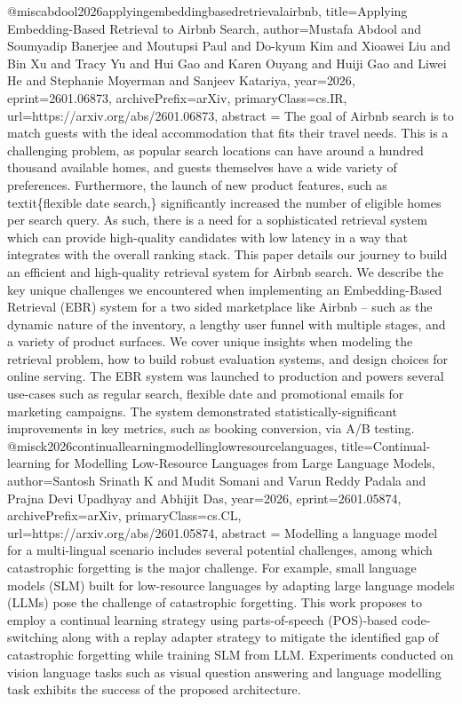 {}@misc{abdool2026applyingembeddingbasedretrievalairbnb,
      title={Applying Embedding-Based Retrieval to Airbnb Search}, 
      author={Mustafa Abdool and Soumyadip Banerjee and Moutupsi Paul and Do-kyum Kim and Xioawei Liu and Bin Xu and Tracy Yu and Hui Gao and Karen Ouyang and Huiji Gao and Liwei He and Stephanie Moyerman and Sanjeev Katariya},
      year={2026},
      eprint={2601.06873},
      archivePrefix={arXiv},
      primaryClass={cs.IR},
      url={https://arxiv.org/abs/2601.06873},
      abstract = {The goal of Airbnb search is to match guests with the ideal accommodation that fits their travel needs. This is a challenging problem, as popular search locations can have around a hundred thousand available homes, and guests themselves have a wide variety of preferences. Furthermore, the launch of new product features, such as \\textit\{flexible date search,\} significantly increased the number of eligible homes per search query. As such, there is a need for a sophisticated retrieval system which can provide high-quality candidates with low latency in a way that integrates with the overall ranking stack.   This paper details our journey to build an efficient and high-quality retrieval system for Airbnb search. We describe the key unique challenges we encountered when implementing an Embedding-Based Retrieval (EBR) system for a two sided marketplace like Airbnb -- such as the dynamic nature of the inventory, a lengthy user funnel with multiple stages, and a variety of product surfaces. We cover unique insights when modeling the retrieval problem, how to build robust evaluation systems, and design choices for online serving. The EBR system was launched to production and powers several use-cases such as regular search, flexible date and promotional emails for marketing campaigns. The system demonstrated statistically-significant improvements in key metrics, such as booking conversion, via A/B testing.}
}@misc{k2026continuallearningmodellinglowresourcelanguages,
      title={Continual-learning for Modelling Low-Resource Languages from Large Language Models}, 
      author={Santosh Srinath K and Mudit Somani and Varun Reddy Padala and Prajna Devi Upadhyay and Abhijit Das},
      year={2026},
      eprint={2601.05874},
      archivePrefix={arXiv},
      primaryClass={cs.CL},
      url={https://arxiv.org/abs/2601.05874},
      abstract = {Modelling a language model for a multi-lingual scenario includes several potential challenges, among which catastrophic forgetting is the major challenge. For example, small language models (SLM) built for low-resource languages by adapting large language models (LLMs) pose the challenge of catastrophic forgetting. This work proposes to employ a continual learning strategy using parts-of-speech (POS)-based code-switching along with a replay adapter strategy to mitigate the identified gap of catastrophic forgetting while training SLM from LLM. Experiments conducted on vision language tasks such as visual question answering and language modelling task exhibits the success of the proposed architecture.}
}
